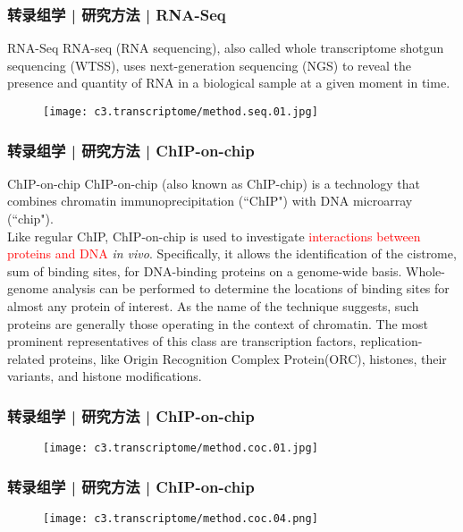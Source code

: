 \begin{frame}
  \frametitle{转录组学 | 研究方法 | RNA-Seq}
  {\footnotesize
  \begin{block}{RNA-Seq}
    RNA-seq (RNA sequencing), also called whole transcriptome shotgun sequencing (WTSS), uses next-generation sequencing (NGS) to reveal the presence and quantity of RNA in a biological sample at a given moment in time.
  \end{block}
  }
  \begin{figure}
    \centering
    \texttt{[image: c3.transcriptome/method.seq.01.jpg]}
  \end{figure}
\end{frame}

\begin{frame}
  \frametitle{转录组学 | 研究方法 | ChIP-on-chip}
  \begin{block}{ChIP-on-chip}
    ChIP-on-chip (also known as ChIP-chip) is a technology that combines chromatin immunoprecipitation (``ChIP") with DNA microarray (``chip").\\
    \vspace{1em}
    Like regular ChIP, ChIP-on-chip is used to investigate \textcolor{red}{interactions between proteins and DNA} \textit{in vivo}. Specifically, it allows the identification of the cistrome, sum of binding sites, for DNA-binding proteins on a genome-wide basis. Whole-genome analysis can be performed to determine the locations of binding sites for almost any protein of interest. As the name of the technique suggests, such proteins are generally those operating in the context of chromatin. The most prominent representatives of this class are transcription factors, replication-related proteins, like Origin Recognition Complex Protein(ORC), histones, their variants, and histone modifications.
  \end{block}
\end{frame}

\begin{frame}
  \frametitle{转录组学 | 研究方法 | ChIP-on-chip}
  \begin{figure}
    \centering
    \texttt{[image: c3.transcriptome/method.coc.01.jpg]}
  \end{figure}
\end{frame}

\begin{frame}
  \frametitle{转录组学 | 研究方法 | ChIP-on-chip}
  \begin{figure}
    \centering
    \texttt{[image: c3.transcriptome/method.coc.04.png]}
  \end{figure}
\end{frame}

